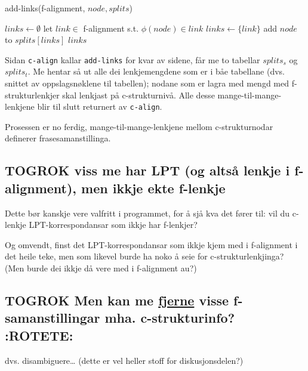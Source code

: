 \documentclass[11pt,a4paper,oneside,draft]{book}
\begin{document}
   \begin{algorithm}[]
   \caption{add-links(f-alignment, $node, splits$)}
   \label{algo:add-links}
      
        $links \gets \emptyset$\;
    {
        {
          let $link \in$ f-alignment s.t. $\phi(node) \in link$ \;
           {$links \gets \{link\}$}
        }
        add $node$ to $splits[links]$ \;
       }
        \Return $links$ \;
  \end{algorithm}

Sidan \texttt{c-align} kallar \texttt{add-links} for kvar av sidene, får me to
tabellar $splits_s$ og $splits_t$. Me hentar så ut alle dei
lenkjemengdene som er i båe tabellane (dvs. snittet av oppslagsnøklene
til tabellen); nodane som er lagra med mengd med f-strukturlenkjer
skal lenkjast på c-strukturnivå. Alle desse mange-til-mange-lenkjene
blir til slutt returnert av \texttt{c-align}.

Prosessen er no ferdig, mange-til-mange-lenkjene mellom
c-strukturnodar definerer frasesamanstillinga.


\subsection{\textbf{TOGROK} viss me har LPT (og altså lenkje i f-alignment), men ikkje ekte f-lenkje}
\label{sec-4.5.1}

    Dette bør kanskje vere valfritt i programmet, for å sjå
    kva det fører til: vil du c-lenkje LPT-korrespondansar som ikkje
    har f-lenkjer?

    Og omvendt, finst det LPT-korrespondansar som ikkje kjem med i
    f-alignment i det heile teke, men som likevel burde ha noko å seie
    for c-strukturlenkjinga? (Men burde dei ikkje då vere med i
    f-alignment au?)
\subsection{\textbf{TOGROK} Men kan me \underline{fjerne} visse f-samanstillingar mha. c-strukturinfo? \textbf{:ROTETE:}}
\label{sec-4.5.2}

    dvs. disambiguere\ldots{}
    (dette er vel heller stoff for diskusjonsdelen?)
\end{document}
